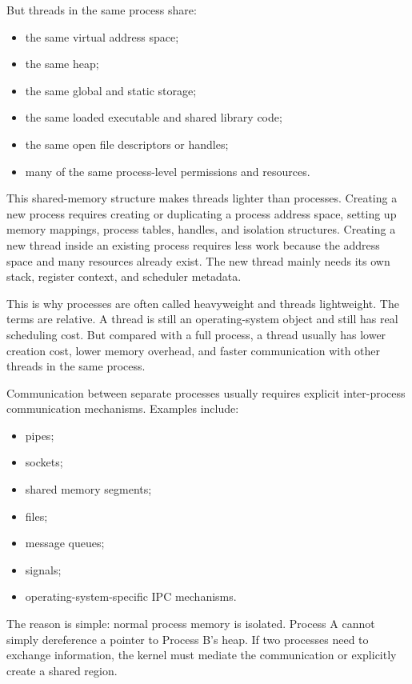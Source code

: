 But threads in the same process share:

\begin{itemize}
    \item the same virtual address space;
    \item the same heap;
    \item the same global and static storage;
    \item the same loaded executable and shared library code;
    \item the same open file descriptors or handles;
    \item many of the same process-level permissions and resources.
\end{itemize}

This shared-memory structure makes threads lighter than processes. Creating a new process requires creating or duplicating a process address space, setting up memory mappings, process tables, handles, and isolation structures. Creating a new thread inside an existing process requires less work because the address space and many resources already exist. The new thread mainly needs its own stack, register context, and scheduler metadata.

This is why processes are often called heavyweight and threads lightweight. The terms are relative. A thread is still an operating-system object and still has real scheduling cost. But compared with a full process, a thread usually has lower creation cost, lower memory overhead, and faster communication with other threads in the same process.

Communication between separate processes usually requires explicit inter-process communication mechanisms. Examples include:

\begin{itemize}
    \item pipes;
    \item sockets;
    \item shared memory segments;
    \item files;
    \item message queues;
    \item signals;
    \item operating-system-specific IPC mechanisms.
\end{itemize}

The reason is simple: normal process memory is isolated. Process A cannot simply dereference a pointer to Process B's heap. If two processes need to exchange information, the kernel must mediate the communication or explicitly create a shared region.

